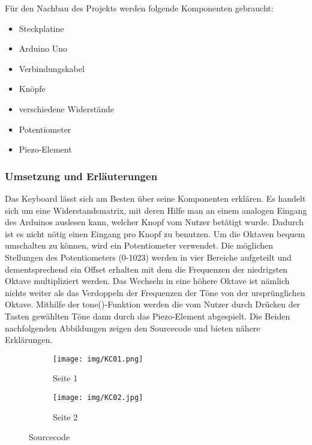 Für den Nachbau des Projekts werden folgende Komponenten gebraucht:
\begin{itemize}
\item{Steckplatine}
\item{Arduino Uno}
\item{Verbindungskabel}
\item{Knöpfe}
\item{verschiedene Widerstände}
\item{Potentiometer}
\item{Piezo-Element}
\end{itemize}

\subsubsection{Umsetzung und Erläuterungen}
Das Keyboard lässt sich am Besten über seine Komponenten erklären.
Es handelt sich um eine Widerstandsmatrix, mit deren Hilfe man an einem analogen Eingang des Arduinos auslesen kann,
welcher Knopf vom Nutzer betätigt wurde. Dadurch ist es nicht nötig einen Eingang pro Knopf zu benutzen.
Um die Oktaven bequem umschalten zu können, wird ein Potentiometer verwendet. Die möglichen Stellungen des Potentiometers (0-1023) werden in vier Bereiche aufgeteilt und dementsprechend ein Offset erhalten mit dem die Frequenzen der niedrigsten Oktave multipliziert werden.
Das Wechseln in eine höhere Oktave ist nämlich nichts weiter als das Verdoppeln der Frequenzen der Töne von der ursprünglichen Oktave.
Mithilfe der tone()-Funktion werden die vom Nutzer durch Drücken der Tasten gewählten Töne dann durch das Piezo-Element abgespielt.
Die Beiden nachfolgenden Abbildungen zeigen den Sourcecode und bieten nähere Erklärungen.

\begin{figure}[h]
	\centering
	\begin{subfigure}[b]{0.48\linewidth}
		\centering
		\texttt{[image: img/KC01.png]}
		\caption{Seite 1}\label{stehend}
	\end{subfigure}\enspace%
	\begin{subfigure}[b]{0.48\linewidth}
		\centering
		\texttt{[image: img/KC02.jpg]}
		\caption{Seite 2}\label{laufend}
	\end{subfigure}
	\caption{Sourcecode}\label{Zeituhr}
\end{figure}

